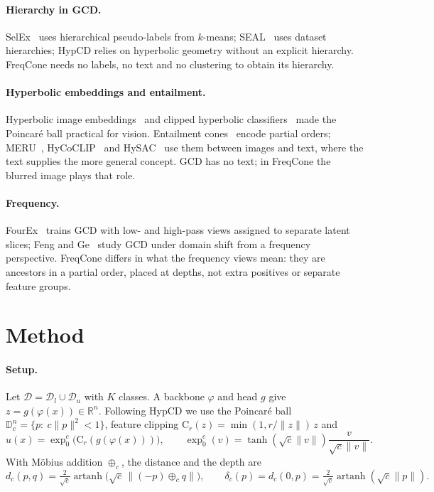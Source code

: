 \documentclass[10pt]{article}
\DeclareMathOperator{\artanh}{artanh}
\begin{document}
\paragraph{Hierarchy in GCD.} SelEx~\cite{rastegar2024selex} uses hierarchical pseudo-labels from $k$-means;
SEAL~\cite{he2025seal} uses dataset hierarchies; HypCD relies on hyperbolic geometry without an explicit
hierarchy. FreqCone needs no labels, no text and no clustering to obtain its hierarchy.

\paragraph{Hyperbolic embeddings and entailment.} Hyperbolic image embeddings~\cite{khrulkov2020hyperbolic}
and clipped hyperbolic classifiers~\cite{guo2022clipped} made the Poincar\'e ball practical for vision.
Entailment cones~\cite{ganea2018cones} encode partial orders; MERU~\cite{desai2023meru},
HyCoCLIP~\cite{pal2025hycoclip} and HySAC~\cite{poppi2025hysac} use them between images and text, where the
text supplies the more general concept. GCD has no text; in FreqCone the blurred image plays that role.

\paragraph{Frequency.} FourEx~\cite{rastegar2026fourex} trains GCD with low- and high-pass views assigned to
separate latent slices; Feng and Ge~\cite{feng2025freqshift} study GCD under domain shift from a frequency
perspective. FreqCone differs in what the frequency views mean: they are ancestors in a partial order, placed
at depths, not extra positives or separate feature groups.

\section{Method}\label{sec:method}
\paragraph{Setup.} Let $\mathcal{D}=\mathcal{D}_l\cup\mathcal{D}_u$ with $K$ classes. A backbone
$\varphi$ and head $g$ give $z=g(\varphi(x))\in\mathbb{R}^n$. Following HypCD we use the Poincar\'e ball
$\mathbb{D}^n_c=\{p:\ c\|p\|^2<1\}$, feature clipping $\mathrm{C}_r(z)=\min(1,r/\|z\|)\,z$ and
\begin{equation}
u(x)=\exp_0^c\big(\mathrm{C}_r(g(\varphi(x)))\big),\qquad
\exp_0^c(v)=\tanh(\sqrt{c}\|v\|)\frac{v}{\sqrt{c}\|v\|}.
\end{equation}
With M\"obius addition $\oplus_c$, the distance and the depth are
\begin{equation}
d_c(p,q)=\tfrac{2}{\sqrt{c}}\artanh\big(\sqrt{c}\,\|(-p)\oplus_c q\|\big),\qquad
\delta_c(p)=d_c(0,p)=\tfrac{2}{\sqrt{c}}\artanh(\sqrt{c}\|p\|).
\end{equation}
\end{document}
